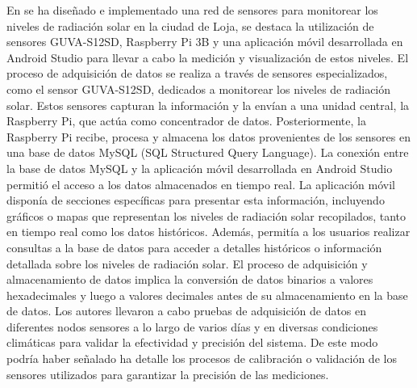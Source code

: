 \bigbreak
En \cite{orozco_jaramillo_diseno_2019} se ha diseñado e implementado una red de sensores para monitorear los niveles de radiación solar en la ciudad de Loja, se destaca la utilización de sensores GUVA-S12SD, Raspberry Pi 3B y una aplicación móvil desarrollada en Android Studio para llevar a cabo la medición y visualización de estos niveles. El proceso de adquisición de datos se realiza a través de sensores especializados, como el sensor GUVA-S12SD, dedicados a monitorear los niveles de radiación solar. Estos sensores capturan la información y la envían a una unidad central, la Raspberry Pi, que actúa como concentrador de datos. Posteriormente, la Raspberry Pi recibe, procesa y almacena los datos provenientes de los sensores en una base de datos MySQL (SQL Structured Query Language). La conexión entre la base de datos MySQL y la aplicación móvil desarrollada en Android Studio permitió el acceso a los datos almacenados en tiempo real. La aplicación móvil disponía de secciones específicas para presentar esta información, incluyendo gráficos o mapas que representan los niveles de radiación solar recopilados, tanto en tiempo real como los datos históricos. Además, permitía a los usuarios realizar consultas a la base de datos para acceder a detalles históricos o información detallada sobre los niveles de radiación solar. El proceso de adquisición y almacenamiento de datos implica la conversión de datos binarios a valores hexadecimales y luego a valores decimales antes de su almacenamiento en la base de datos. Los autores llevaron a cabo pruebas de adquisición de datos en diferentes nodos sensores a lo largo de varios días y en diversas condiciones climáticas para validar la efectividad y precisión del sistema. De este modo podría haber señalado ha detalle los procesos de calibración o validación de los sensores utilizados para garantizar la precisión de las mediciones.

